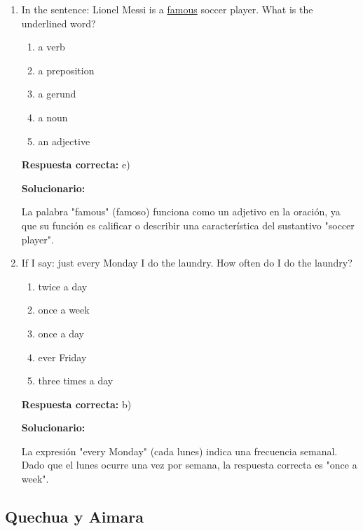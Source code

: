 \begin{enumerate}[resume]

\item In the sentence: Lionel Messi is a \underline{famous} soccer player.
What is the underlined word?

\begin{enumerate}[label=\alph*)]
	\item a verb
	\item a preposition
	\item a gerund
	\item a noun
	\item an adjective
\end{enumerate}

\textbf{Respuesta correcta:} e)

\vspace{2mm}
\textbf{Solucionario:}

La palabra "famous" (famoso) funciona como un adjetivo en la oración, ya que su función es calificar o describir una característica del sustantivo "soccer player".

\vspace{6mm}

\item If I say: just every Monday I do the laundry.
How often do I do the laundry?

\begin{enumerate}[label=\alph*)]
	\item twice a day
	\item once a week
	\item once a day
	\item ever Friday
	\item three times a day
\end{enumerate}

\textbf{Respuesta correcta:} b)

\vspace{2mm}
\textbf{Solucionario:}

La expresión "every Monday" (cada lunes) indica una frecuencia semanal. Dado que el lunes ocurre una vez por semana, la respuesta correcta es "once a week".

\vspace{6mm}
\end{enumerate}





\subsection*{Quechua y Aimara}

